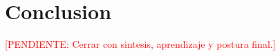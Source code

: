 \documentclass[
	spanish,
	letterpaper, oneside
]{article}
\newcommand{\pendiente}[1]{\textcolor{red}{[PENDIENTE: #1]}}
\begin{document}
\section{Conclusion}

\pendiente{Cerrar con sintesis, aprendizaje y postura final.}





\end{document}
